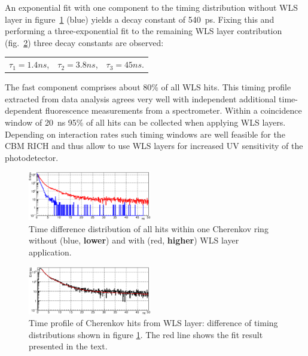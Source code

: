 \documentclass[final,5p,times,twocolumn]{elsarticle}
\begin{document}
An exponential fit with one component to the timing distribution without WLS layer in figure~\ref{fig:WLS} (blue) yields a decay constant of 540~ps. Fixing this and performing a three-exponential fit to the remaining WLS layer contribution (fig.~\ref{fig:WLSdiff}) three decay constants are observed:
\begin{center}
\begin{tabular}{ c c c }
$ \tau_1 = 1.4 ns $, & $ \tau_2 = 3.8 ns $, & $ \tau_3 = 45 ns $. \\
\end{tabular}
\end{center}
The fast component comprises about 80\% of all WLS hits. This timing profile extracted from data analysis agrees very well with independent additional time-dependent fluorescence measurements from a spectrometer.
Within a coincidence window of 20~ns 95\% of all hits can be collected when applying WLS layers. Depending on interaction rates such timing windows are well feasible for the CBM RICH and thus allow to use WLS layers for increased UV sensitivity of the photodetector.

\begin{figure}[h]
	\centering
	\includegraphics[width=0.48\textwidth]{figures/Two_curves_1Nov.eps}
	\caption{Time difference distribution of all hits within one Cherenkov ring without (blue, \textbf{lower}) and with (red, \textbf{higher}) WLS layer application.}
	\label{fig:WLS}
\end{figure}

\begin{figure}[h]
	\centering
	\includegraphics[width=0.48\textwidth]{figures/WLSdiff_1Nov.eps}
	\caption{Time profile of Cherenkov hits from WLS layer: difference of timing distributions shown in figure \ref{fig:WLS}. The red line shows the fit result presented in the text.}
	\label{fig:WLSdiff}
\end{figure}

\end{document}
